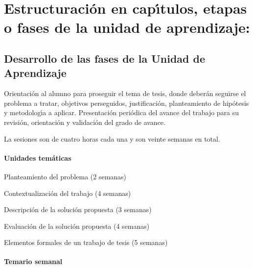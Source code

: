 \section{Estructuraci\'{o}n en cap\'{\i}tulos, etapas o fases de la unidad de
  aprendizaje:}

\subsection{Desarrollo de las fases de la Unidad de Aprendizaje}

\quad

Orientaci\'{o}n al alumno para proseguir el tema de tesis, donde
deber\'{a}n seguirse el problema a tratar, objetivos perseguidos,
justificaci\'{o}n, planteamiento de hip\'{o}tesis y metodolog\'{\i}a a
aplicar.  Presentaci\'{o}n peri\'{o}dica del avance del trabajo para
su revisi\'{o}n, orientaci\'{o}n y validaci\'{o}n del grado de
avance.

La sesiones son de cuatro horas cada una y son veinte semanas en
total.

\paragraph{Unidades tem\'{a}ticas}

\quad

\begin{description}[itemsep=-2pt]
\item[UT1] Planteamiento del problema (2 semanas)
\item[UT2] Contextualizaci\'{o}n del trabajo (4 semanas)
\item[UT3] Descripci\'{o}n de la soluci\'{o}n propuesta (3 semanas)
\item[UT4] Evaluaci\'{o}n de la soluci\'{o}n propuesta (4 semanas)
\item[UT5] Elementos formales de un trabajo de tesis (5 semanas)
\end{description}

\paragraph{Temario semanal}

\quad
